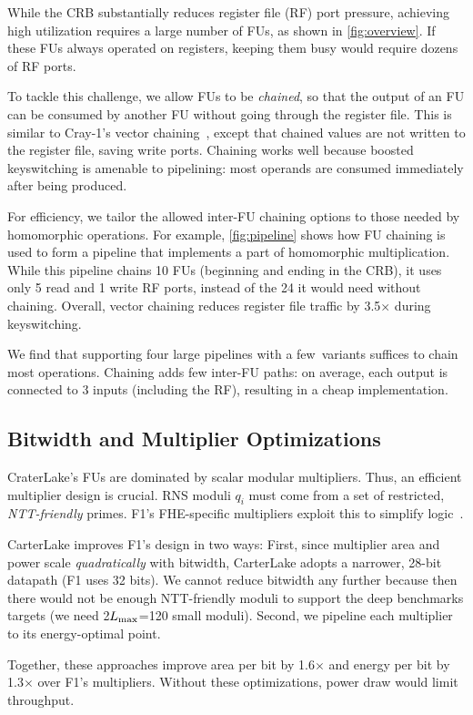 \figPipeline

While the CRB substantially reduces register file (RF) port pressure, achieving
high utilization requires a large number of FUs, as shown in
\autoref{fig:overview}. If these FUs always operated on registers, keeping them
busy would require dozens of RF ports.

To tackle this challenge, we allow FUs to be \emph{chained}, so that the output
of an FU can be consumed by another FU without going through the register file.
This is similar to Cray-1's vector chaining~\cite{russell:cacm78:cray}, except
that chained values are not written to the register file, saving write ports.
Chaining works well because boosted keyswitching is amenable to pipelining:
most operands are consumed immediately after being produced.

For efficiency, we tailor the allowed inter-FU chaining options to those needed
by homomorphic operations. For example, \autoref{fig:pipeline} shows how FU
chaining is used to form a pipeline that implements a part of homomorphic
multiplication. While this pipeline chains 10 FUs (beginning and ending in the
CRB), it uses only 5 read and 1 write RF ports, instead of the 24 it would need
without chaining. Overall, vector chaining reduces register file traffic by
3.5$\times$ during keyswitching.

We find that supporting four large pipelines with a few~variants suffices to
chain most operations. Chaining adds few inter-FU paths: on average, each
output is connected to 3 inputs (including the RF), resulting in a cheap
implementation.

\subsection{Bitwidth and Multiplier Optimizations}\label{sec:bitwidth}

CraterLake's FUs are dominated by scalar modular multipliers. Thus, an
efficient multiplier design is crucial. RNS moduli $q_i$ must come from a set
of restricted, \emph{NTT-friendly} primes. F1's FHE-specific multipliers
exploit this to simplify logic~\cite{feldmann:micro21:f1}.

CarterLake improves F1's design in two ways: First, since multiplier area and
power scale \emph{quadratically} with bitwidth, CarterLake adopts a narrower,
28-bit datapath (F1 uses 32 bits). We cannot reduce bitwidth any further
because then there would not be enough NTT-friendly moduli to support the deep
benchmarks \name targets (we need 2$L_{\textrm{max}}$=120 small moduli). Second, we
pipeline each multiplier to its energy-optimal point.

Together, these approaches improve area per bit by 1.6$\times$ and energy per
bit by 1.3$\times$ over F1's multipliers. Without these optimizations, power
draw would limit throughput.
